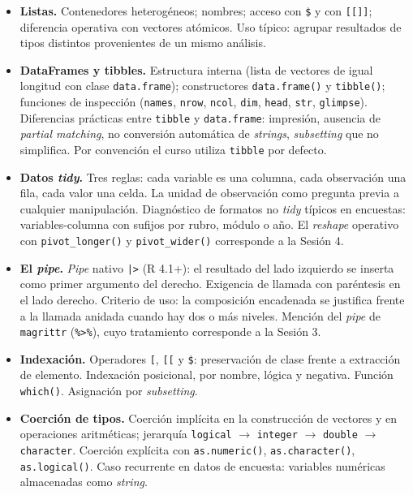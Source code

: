 \documentclass[11pt,letterpaper]{article}
\begin{document}
\begin{itemize}[leftmargin=*, itemsep=2pt]
    \item \textbf{Listas.} Contenedores heterogéneos; nombres; acceso con \texttt{\$} y con \texttt{[[]]}; diferencia operativa con vectores atómicos. Uso típico: agrupar resultados de tipos distintos provenientes de un mismo análisis.
    \item \textbf{DataFrames y tibbles.} Estructura interna (lista de vectores de igual longitud con clase \texttt{data.frame}); constructores \texttt{data.frame()} y \texttt{tibble()}; funciones de inspección (\texttt{names}, \texttt{nrow}, \texttt{ncol}, \texttt{dim}, \texttt{head}, \texttt{str}, \texttt{glimpse}). Diferencias prácticas entre \texttt{tibble} y \texttt{data.frame}: impresión, ausencia de \textit{partial matching}, no conversión automática de \textit{strings}, \textit{subsetting} que no simplifica. Por convención el curso utiliza \texttt{tibble} por defecto.
    \item \textbf{Datos \textit{tidy}.} Tres reglas: cada variable es una columna, cada observación una fila, cada valor una celda. La unidad de observación como pregunta previa a cualquier manipulación. Diagnóstico de formatos no \textit{tidy} típicos en encuestas: variables-columna con sufijos por rubro, módulo o año. El \textit{reshape} operativo con \texttt{pivot\_longer()} y \texttt{pivot\_wider()} corresponde a la Sesión 4.
    \item \textbf{El \textit{pipe}.} \textit{Pipe} nativo \texttt{|>} (R 4.1+): el resultado del lado izquierdo se inserta como primer argumento del derecho. Exigencia de llamada con paréntesis en el lado derecho. Criterio de uso: la composición encadenada se justifica frente a la llamada anidada cuando hay dos o más niveles. Mención del \textit{pipe} de \texttt{magrittr} (\texttt{\%>\%}), cuyo tratamiento corresponde a la Sesión 3.
    \item \textbf{Indexación.} Operadores \texttt{[}, \texttt{[[} y \texttt{\$}: preservación de clase frente a extracción de elemento. Indexación posicional, por nombre, lógica y negativa. Función \texttt{which()}. Asignación por \textit{subsetting}.
    \item \textbf{Coerción de tipos.} Coerción implícita en la construcción de vectores y en operaciones aritméticas; jerarquía \texttt{logical} $\to$ \texttt{integer} $\to$ \texttt{double} $\to$ \texttt{character}. Coerción explícita con \texttt{as.numeric()}, \texttt{as.character()}, \texttt{as.logical()}. Caso recurrente en datos de encuesta: variables numéricas almacenadas como \textit{string}.

\end{itemize}
\end{document}
